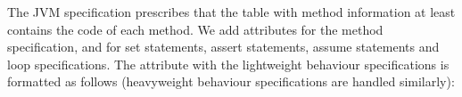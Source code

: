 
The JVM specification prescribes that the table with method
information at least contains the code of each method. We add
attributes for the method specification, and for set statements,
assert statements, assume statements and loop specifications.  The
attribute with the lightweight behaviour specifications is formatted
as follows (heavyweight behaviour specifications are handled
similarly):

